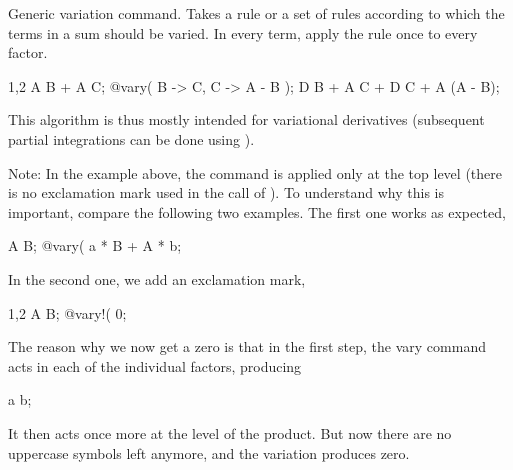 
Generic variation command.  Takes a rule or a set of rules
according to which the terms in a sum should be varied. In every term,
apply the rule once to every factor.
\begin{screen}{1,2}
A B + A C;
@vary(%
          B -> \epsilon C,
          C -> \epsilon A - \epsilon B );
\epsilon D B + A \epsilon C + \epsilon D C 
                   + A (\epsilon A - \epsilon B);
\end{screen}
This algorithm is thus mostly intended for variational derivatives
(subsequent partial integrations can be done
using ).

Note: In the example above, the command is applied only at the top
level (there is no exclamation mark used in the call
of ). To understand why this is important, compare
the following two examples. The first one works as expected,
\begin{screen}
A B;
@vary(%
a * B + A * b;
\end{screen}
In the second one, we add an exclamation mark,
\begin{screen}{1,2}
A B;
@vary!(%
0;
\end{screen}
The reason why we now get a zero is that in the first step, the vary
command acts in each of the individual factors, producing
\begin{screen}
a b;
\end{screen}
It then acts once more at the level of the product. But now there are
no uppercase symbols left anymore, and the variation produces zero.


